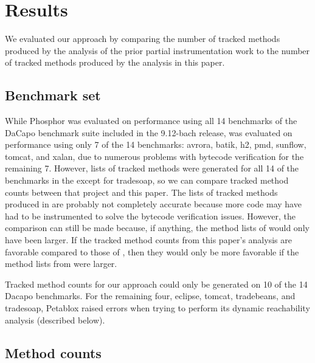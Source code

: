 \chapter{Results}
We evaluated our approach by comparing the number of tracked methods
produced by the analysis of the prior partial instrumentation work to
the number of tracked methods produced by the analysis in this paper.

\section{Benchmark set}
While Phosphor \cite{phosphor_oopsla} was evaluated on performance
using all 14 benchmarks of the DaCapo benchmark suite
\cite{dacapobach} included in the 9.12-bach release,
\cite{manoj_project} was evaluated on performance using only 7 of the
14 benchmarks: avrora, batik, h2, pmd, sunflow, tomcat, and xalan, due
to numerous problems with bytecode verification for the remaining
7. However, lists of tracked methods were generated for all 14 of the
benchmarks in the \cite{manoj_project} except for tradesoap, so we can
compare tracked method counts between that project and this paper. The
lists of tracked methods produced in \cite{manoj_project} are probably
not completely accurate because more code may have had to be
instrumented to solve the bytecode verification issues. However, the
comparison can still be made because, if anything, the method lists of
\cite{manoj_project} would only have been larger. If the tracked
method counts from this paper's analysis are favorable compared to
those of \cite{manoj_project}, then they would only be more favorable
if the method lists from \cite{manoj_project} were larger.

Tracked method counts for our approach could only be generated on 10
of the 14 Dacapo benchmarks. For the remaining four, eclipse, tomcat,
tradebeans, and tradesoap, Petablox raised errors when trying to
perform its dynamic reachability analysis (described below).

\section{Method counts}

